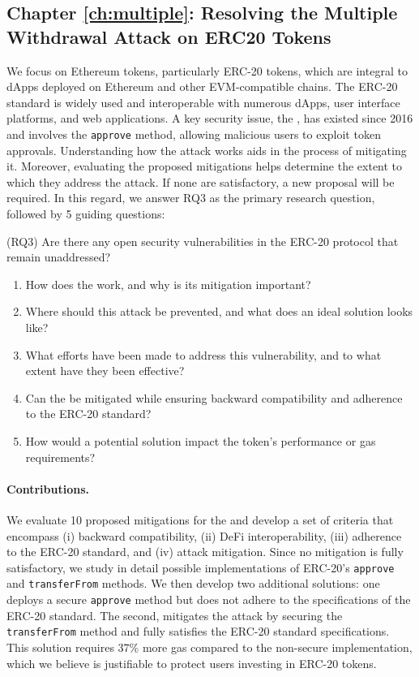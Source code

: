 \subsection{Chapter \ref{ch:multiple}: Resolving the Multiple Withdrawal Attack on ERC20 Tokens}
We focus on Ethereum tokens, particularly ERC-20 tokens, which are integral to dApps deployed on Ethereum and other EVM-compatible chains. The ERC-20 standard is widely used and interoperable with numerous dApps, user interface platforms, and web applications. A key security issue, the \mwa, has existed since 2016 and involves the \texttt{approve} method, allowing malicious users to exploit token approvals. Understanding how the attack works aids in the process of mitigating it. Moreover, evaluating the proposed mitigations helps determine the extent to which they address the attack. If none are satisfactory, a new proposal will be required. In this regard, we answer RQ3 as the primary research question, followed by 5 guiding questions:

\noindent (RQ3) Are there any open security vulnerabilities in the ERC-20 protocol that remain unaddressed?
\begin{enumerate}[label={(RQ3.\arabic*)},leftmargin=*]
	\item How does the \mwa work, and why is its mitigation important?
	\item Where should this attack be prevented, and what does an ideal solution looks like?
	\item What efforts have been made to address this vulnerability, and to what extent have they been effective?
	\item Can the \mwa be mitigated while ensuring backward compatibility and adherence to the ERC-20 standard?
	\item How would a potential solution impact the token's performance or gas requirements?
\end{enumerate}
\paragraph{Contributions.} We evaluate 10 proposed mitigations for the \mwa and develop a set of criteria that encompass (i) backward compatibility, (ii) DeFi interoperability, (iii) adherence to the ERC-20 standard, and (iv) attack mitigation. Since no mitigation is fully satisfactory, we study in detail possible implementations of ERC-20's \texttt{approve} and \texttt{transferFrom} methods. We then develop two additional solutions: one deploys a secure \texttt{approve} method but does not adhere to the specifications of the ERC-20 standard. The second, mitigates the attack by securing the \texttt{transferFrom} method and fully satisfies the ERC-20 standard specifications. This solution requires 37\% more gas compared to the non-secure implementation, which we believe is justifiable to protect users investing in ERC-20 tokens.

